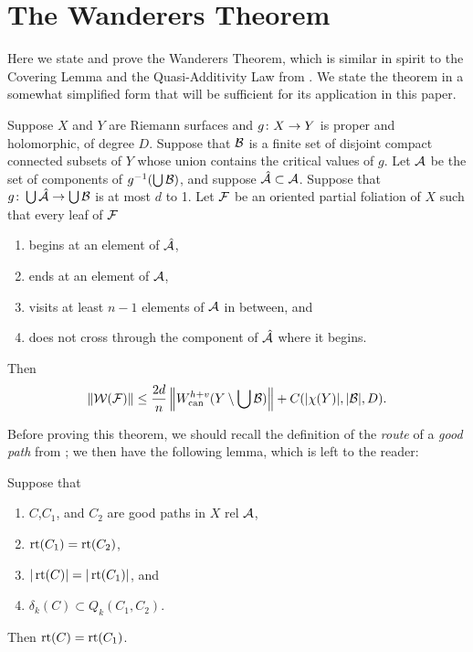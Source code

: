 \documentclass[12pt]{amsart}
\begin{document}
\section{The Wanderers Theorem}\label{app:wanderers}
Here we state and prove the Wanderers Theorem, 
which is similar in spirit to the Covering Lemma and the Quasi-Additivity Law from \cite{KL:QA}.
We state the theorem in a somewhat simplified form that will be sufficient for its application in this paper. 
\begin{theorem} \label{thm:wanderers}
Suppose $X$ and $Y$ are Riemann surfaces and $g\from X \to Y$ is proper and holomorphic, of degree $D$.
Suppose that $\BB$ is a finite set of disjoint compact connected subsets of $Y$ whose union contains the critical values of $g$.
Let $\AA$ be the set of components of $g\invp{\bigcup \BB}$,
and suppose $\hat \AA \subset \AA$. 
Suppose that $g\from \bigcup \hat \AA \to \bigcup \BB$ is at most $d$ to 1. 
Let $\FF$ be an oriented partial foliation of $X$ such that every leaf of $\FF$
\begin{enumerate}
\item
begins at an element of $\hat\AA$, 
\item
ends at an element of $\AA$,
\item
visits at least $n-1$ elements of $\AA$ in between, and
\item
does not cross through the component of $\hat \AA$ where it begins. 
\end{enumerate}
Then 
\begin{equation} \label{eq:wanderers}
\norm{\WW(\FF)} \le \frac{2d}n \norm{\wcan^{h+v}(Y \sm \bigcup \BB)} + C(|\chi(Y)| , |\BB|, D).
\end{equation}
\end{theorem}
Before proving this theorem,
we should recall the definition of the \emph{route} of a \emph{good path} from \cite{KL:QA}; 
we then have the following lemma, which is left to the reader:
\begin{lemma} \label{lem:work-backwards}
Suppose that
\begin{enumerate}
\item
 $C$,$C_1$, and $C_2$ are good paths in $X$ rel $\AA$,
\item
 $\rt{C_1} = \rt{C_2}$, 
\item
 $|\rt{C}| = |\rt{C_1}|$, 
 and 
\item
 $\delta_k(C) \subset Q_k(C_1, C_2)$. 
\end{enumerate}
Then $\rt C  = \rt{C_1}$. 
\end{lemma}
\end{document}
